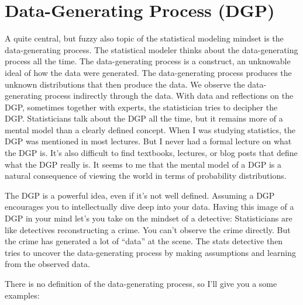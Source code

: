 \documentclass[
  10pt,
]{scrbook}
\begin{document}
\hypertarget{data-generating-process-dgp}{%
\section{Data-Generating Process (DGP)}\label{data-generating-process-dgp}}

A quite central, but fuzzy also topic of the statistical modeling mindset is the data-generating process.
The statistical modeler thinks about the data-generating process all the time.
The data-generating process is a construct, an unknowable ideal of how the data were generated.
The data-generating process produces the unknown distributions that then produce the data.
We observe the data-generating process indirectly through the data.
With data and reflections on the DGP, sometimes together with experts, the statistician tries to decipher the DGP.
Statisticians talk about the DGP all the time, but it remains more of a mental model than a clearly defined concept.
When I was studying statistics, the DGP was mentioned in most lectures.
But I never had a formal lecture on what the DGP is.
It's also difficult to find textbooks, lectures, or blog posts that define what the DGP really is.
It seems to me that the mental model of a DGP is a natural consequence of viewing the world in terms of probability distributions.

The DGP is a powerful idea, even if it's not well defined.
Assuming a DGP encourages you to intellectually dive deep into your data.
Having this image of a DGP in your mind let's you take on the mindset of a detective:
Statisticians are like detectives reconstructing a crime.
You can't observe the crime directly.
But the crime has generated a lot of ``data'' at the scene.
The stats detective then tries to uncover the data-generating process by making assumptions and learning from the observed data.

There is no definition of the data-generating process, so I'll give you a some examples:
\end{document}
